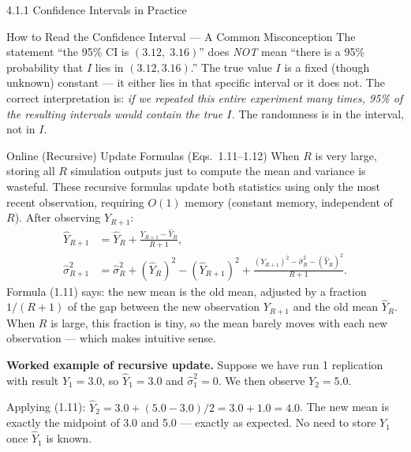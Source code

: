 \documentclass[aspectratio=169,10pt]{beamer}
\begin{document}
\begin{frame}[allowframebreaks]{4.1.1 Confidence Intervals in Practice}
\begin{alertblock}{How to Read the Confidence Interval --- A Common Misconception}
  The statement ``the 95\% CI is $(3.12,\; 3.16)$'' does \emph{NOT}
  mean ``there is a 95\% probability that $I$ lies in $(3.12, 3.16)$.''
  The true value $I$ is a fixed (though unknown) constant --- it either
  lies in that specific interval or it does not.  The correct
  interpretation is: \emph{if we repeated this entire experiment many
  times, 95\% of the resulting intervals would contain the true $I$.}
  The randomness is in the interval, not in $I$.
\end{alertblock}

\framebreak

\begin{block}{Online (Recursive) Update Formulas (Eqs.\ 1.11--1.12)}
  When $R$ is very large, storing all $R$ simulation outputs just to
  compute the mean and variance is wasteful.  These recursive formulas
  update both statistics using only the most recent observation, requiring
  $O(1)$ memory (constant memory, independent of $R$).  After observing
  $Y_{R+1}$:
  \begin{align}
    \hat{Y}_{R+1} &= \hat{Y}_R + \frac{Y_{R+1} - \hat{Y}_R}{R+1},
    \tag{1.11} \\[6pt]
    \hat{\sigma}_{R+1}^2 &= \hat{\sigma}_R^2
      + (\hat{Y}_R)^2 - (\hat{Y}_{R+1})^2
      + \frac{(Y_{R+1})^2 - \hat{\sigma}_R^2 - (\hat{Y}_R)^2}{R+1}.
    \tag{1.12}
  \end{align}
  Formula (1.11) says: the new mean is the old mean, adjusted by a
  fraction $1/(R+1)$ of the gap between the new observation $Y_{R+1}$
  and the old mean $\hat{Y}_R$.  When $R$ is large, this fraction is
  tiny, so the mean barely moves with each new observation --- which
  makes intuitive sense.
\end{block}

\textbf{Worked example of recursive update.}
Suppose we have run 1 replication with result $Y_1 = 3.0$, so
$\hat{Y}_1 = 3.0$ and $\hat{\sigma}_1^2 = 0$.  We then observe
$Y_2 = 5.0$.

Applying (1.11): $\hat{Y}_2 = 3.0 + (5.0 - 3.0)/2 = 3.0 + 1.0 = 4.0$.
The new mean is exactly the midpoint of 3.0 and 5.0 --- exactly
as expected.  No need to store $Y_1$ once $\hat{Y}_1$ is known.


\end{frame}
\end{document}
